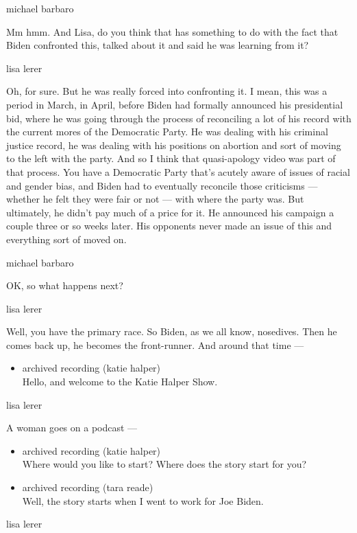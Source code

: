 michael barbaro

Mm hmm. And Lisa, do you think that has something to do with the fact
that Biden confronted this, talked about it and said he was learning
from it?

lisa lerer

Oh, for sure. But he was really forced into confronting it. I mean, this
was a period in March, in April, before Biden had formally announced his
presidential bid, where he was going through the process of reconciling
a lot of his record with the current mores of the Democratic Party. He
was dealing with his criminal justice record, he was dealing with his
positions on abortion and sort of moving to the left with the party. And
so I think that quasi-apology video was part of that process. You have a
Democratic Party that's acutely aware of issues of racial and gender
bias, and Biden had to eventually reconcile those criticisms --- whether
he felt they were fair or not --- with where the party was. But
ultimately, he didn't pay much of a price for it. He announced his
campaign a couple three or so weeks later. His opponents never made an
issue of this and everything sort of moved on.

michael barbaro

OK, so what happens next?

lisa lerer

Well, you have the primary race. So Biden, as we all know, nosedives.
Then he comes back up, he becomes the front-runner. And around that time
---

\begin{itemize}
\tightlist
\item
  archived recording (katie halper)\\
  Hello, and welcome to the Katie Halper Show.
\end{itemize}

lisa lerer

A woman goes on a podcast ---

\begin{itemize}
\item
  archived recording (katie halper)\\
  Where would you like to start? Where does the story start for you?
\item
  archived recording (tara reade)\\
  Well, the story starts when I went to work for Joe Biden.
\end{itemize}

lisa lerer

